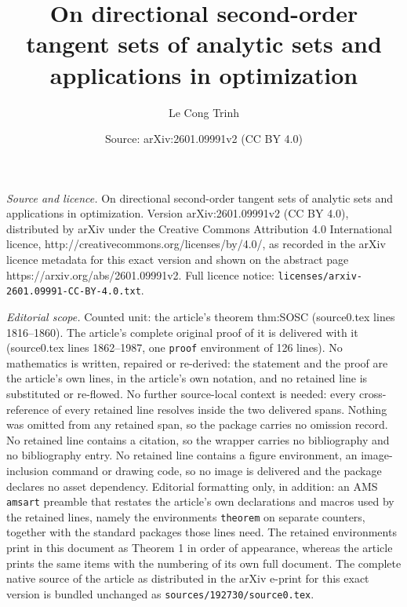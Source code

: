 \documentclass[10pt,a4paper]{amsart}
\title{On directional second-order tangent sets of analytic sets and applications in optimization}
\author{Le Cong Trinh}
\date{Source: arXiv:2601.09991v2 (CC BY 4.0)}
\begin{document}
\maketitle

\noindent\emph{Source and licence.} On directional second-order tangent sets of analytic sets and applications in optimization. Version arXiv:2601.09991v2 (CC BY 4.0), distributed by arXiv under the Creative Commons Attribution 4.0 International licence, http://creativecommons.org/licenses/by/4.0/, as recorded in the arXiv licence metadata for this exact version and shown on the abstract page https://arxiv.org/abs/2601.09991v2. Full licence notice: \texttt{licenses/arxiv-2601.09991-CC-BY-4.0.txt}.\par\smallskip

\noindent\textit{Editorial scope.} Counted unit: the article's theorem thm:SOSC (source0.tex lines 1816--1860). The article's complete original proof of it is delivered with it (source0.tex lines 1862--1987, one \texttt{proof} environment of 126 lines). No mathematics is written, repaired or re-derived: the statement and the proof are the article's own lines, in the article's own notation, and no retained line is substituted or re-flowed.  No further source-local context is needed: every cross-reference of every retained line resolves inside the two delivered spans.  Nothing was omitted from any retained span, so the package carries no omission record.  No retained line contains a citation, so the wrapper carries no bibliography and no bibliography entry.  No retained line contains a figure environment, an image-inclusion command or drawing code, so no image is delivered and the package declares no asset dependency.  Editorial formatting only, in addition: an AMS \texttt{amsart} preamble that restates the article's own declarations and macros used by the retained lines, namely the environments \texttt{theorem} on separate counters, together with the standard packages those lines need.  The retained environments print in this document as Theorem 1 in order of appearance, whereas the article prints the same items with the numbering of its own full document.  The complete native source of the article as distributed in the arXiv e-print for this exact version is bundled unchanged as \texttt{sources/192730/source0.tex}.
\end{document}
